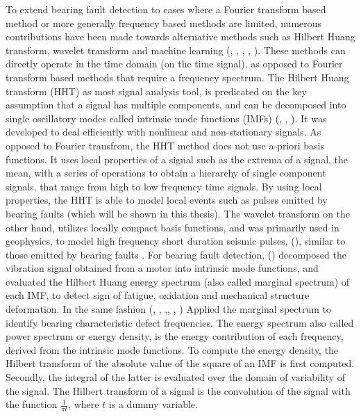 \documentclass[../Main/thesis.tex]{subfiles}
\begin{document}
 
\justify
 To extend bearing fault detection to cases where a Fourier transform based method or more generally frequency based methods are limited,
numerous contributions have been made towards alternative methods such as Hilbert Huang transform, wavelet transform and machine learning (\cite{zhang2019}, \cite{xiaoan2018}, \cite{rai2016}, \cite{konar2011}, \cite{rai2006} ). These methods can directly operate in the time domain (on the time signal), as opposed to Fourier transform based methods that require a frequency spectrum. 
\justify
The Hilbert Huang transform (HHT) as most signal analysis tool, is predicated on the key assumption that a signal has multiple components, and can be decomposed into single oscillatory modes called intrinsic mode functions (IMFs) (\cite{fosso2019}, \cite{huang08}, \cite{huang98}). It was developed to deal efficiently with nonlinear and non-stationary signals. As opposed to Fourier transfrom, the HHT method does not use a-priori basis functions. It uses local properties of a signal such as the extrema of a signal, the mean, with a series of operations to obtain a hierarchy of single component signals, that range from high to low frequency time signals. By using local properties, the HHT is able to model local events such as pulses emitted by bearing faults (which will be shown in this thesis). The wavelet transform on the other hand, utilizes locally compact basis functions, and was primarily used in geophysics, to model high frequency short duration seismic pulses, (\cite{albert09}), similar to those emitted by bearing faults .
\justify
For bearing fault detection, (\cite{fan2016}) decomposed the vibration signal obtained from a motor into intrinsic mode functions, and evaluated the Hilbert Huang energy spectrum (also called marginal spectrum) of each IMF, to detect sign of fatigue, oxidation and mechanical structure deformation. In the same fashion (\cite{peng2004}, \cite{soualhi2015}, \cite{osman2014},\cite{osman2013a}, \cite{osman2013b}, \cite{li2008}) Applied the marginal spectrum to identify bearing characteristic defect frequencies. The energy spectrum also called power spectrum or energy density, is the energy contribution of each frequency, derived from the intrinsic mode functions.
To compute the energy density, the Hilbert transform of the absolute value of the square of an IMF is first computed. Secondly, the integral of the latter is evaluated over the domain of variability of the signal. The Hilbert transform of a signal is the convolution of the signal with the function $\frac{1}{\pi t}$, where $t$ is a dummy variable.
\end{document}
